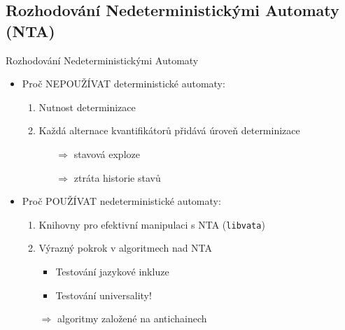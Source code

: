 \documentclass{beamer}
\begin{document}
	\subsection{Rozhodování Nedeterministickými Automaty (NTA)}
	\begin{frame}{Rozhodování Nedeterministickými Automaty}
	  \begin{itemize}
    \item Proč {\color{red} NEPOUŽÍVAT} deterministické automaty:
    \pause
    \begin{enumerate}
			\item Nutnost determinizace
      \pause
      \item Každá alternace kvantifikátorů přidává úroveň determinizace
      \pause
      \begin{itemize}
        \item[$\Rightarrow$]stavová exploze
      \pause
        \item[$\Rightarrow$]ztráta historie stavů
      \pause
      \end{itemize}
    \end{enumerate}
		\bigskip
    \item Proč {\color{green} POUŽÍVAT} nedeterministické automaty:
    \begin{enumerate}
      \pause
      \item Knihovny pro efektivní manipulaci s NTA (\texttt{libvata})
      \pause
			\item Výrazný pokrok v algoritmech nad NTA
			\pause
      \begin{itemize}
			  \item Testování jazykové inkluze
			  \pause
				\item {\color{blue}Testování universality!}
				\pause
      \end{itemize}
			\item[$\Rightarrow$]algoritmy založené na antichainech
    \end{enumerate}
  \end{itemize}
	\end{frame}
	
\end{document}
